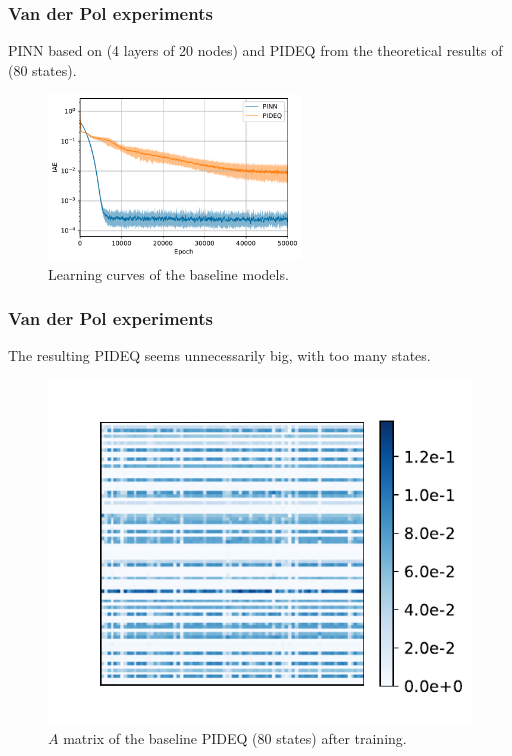 \documentclass[t]{beamer}
\begin{document}
\begin{frame}
    \frametitle{Van der Pol experiments}
    PINN based on \textcite{Antonelo2021} (4 layers of 20 nodes) and PIDEQ from the theoretical results of \textcite{Ghaoui2019} (80 states).

    \begin{figure}[h]
	\centering
	\includegraphics[width=0.6\textwidth]{../images/exp_1_iae.pdf}
	\caption{Learning curves of the baseline models.}
	\label{fig:baseline-iae}
    \end{figure}
\end{frame}

\begin{frame}
    \frametitle{Van der Pol experiments}
    The resulting PIDEQ seems unnecessarily big, with too many states.
    \begin{figure}[h]
	\includegraphics[width=.4\textwidth]{../images/exp_1_matplot.pdf}
	\caption{$A$ matrix of the baseline PIDEQ (80 states) after training.}
	\label{fig:baseline-pideq-A}
    \end{figure}
\end{frame}
\end{document}
